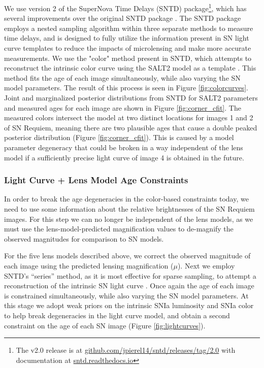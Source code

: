 \documentclass[12pt,dvipsnames]{article}
\def\SNABC{SN Requiem\xspace}
\begin{document}
We use version 2 of the SuperNova Time Delays (SNTD) package\footnote{The v2.0 release is at \href{https://github.com/jpierel14/sntd/releases/tag/2.0}{github.com/jpierel14/sntd/releases/tag/2.0} with documentation at 
\href{https://sntd.readthedocs.io/en/latest/}{sntd.readthedocs.io}}, which has several improvements over the original SNTD package \cite{pierel_turning_2019}. The SNTD package employs a nested sampling algorithm within three separate methods to measure time delays, and is designed to fully utilize the information present in SN light curve templates \cite{hsiao_k_2007,guy_salt2:_2007,kessler_results_2010,pierel_extending_2018} to reduce the impacts of microlensing and make more accurate measurements. We use the "color" method present in SNTD, which attempts to reconstruct the intrinsic color curve using the SALT2 model as a template \cite{guy_salt2:_2007}. This method fits the age of each image simultaneously, while also varying the SN model parameters. The result of this process is seen in Figure \ref{fig:colorcurves}. Joint and marginalized posterior distributions
from SNTD for SALT2 parameters and measured ages for each image are shown in Figure \ref{fig:corner_cfit}.  The measured colors intersect the model at two distinct locations for images 1 and 2 of \SNABC, meaning there are two plausible ages that cause a double peaked posterior distribution (Figure \ref{fig:corner_cfit}). This is caused by a model parameter degeneracy that could be broken in a way independent of the lens model if a sufficiently precise light curve of image 4 is obtained in the future.


\subsubsection*{Light Curve + Lens Model Age Constraints}

In order to break the age degeneracies in the color-based constraints today, we need to use some information about the relative brightnesses of the \SNABC images.  For this step we can no longer be independent of the lens models, as we must use the lens-model-predicted magnification values to de-magnify the observed magnitudes for comparison to SN models. 

For the five lens models described above, we correct the observed magnitude of each image using the predicted lensing magnification ($\mu$). Next we employ SNTD's ``series'' method, as it is most effective for sparse sampling, to attempt a reconstruction of the intrinsic SN light curve \cite{pierel_turning_2019}. Once again the age of each image is constrained simultaneously, while also varying the SN model parameters. At this stage we adopt weak priors on the intrinsic SNIa luminosity \cite{wang_determination_2006} and SNIa color \cite{mosher_cosmological_2014} to help break degeneracies in the light curve model, and obtain a second constraint on the age of each SN image (Figure \ref{fig:lightcurves}). 
\end{document}
